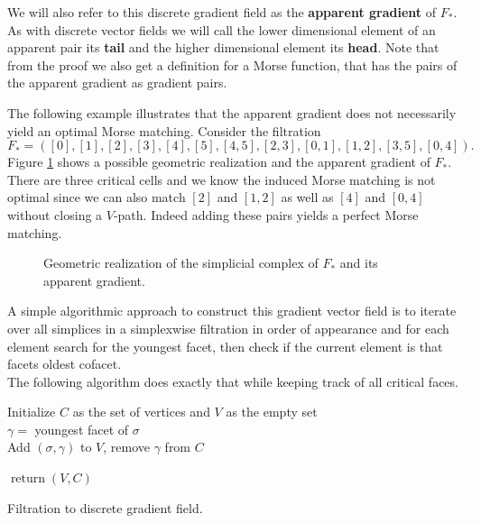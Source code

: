 We will also refer to this discrete gradient field as the \textbf{apparent gradient} of $F_*$. As with discrete vector fields we will call the lower dimensional element of an apparent pair its \textbf{tail} and the higher dimensional element its \textbf{head}. Note that from the proof we also get a definition for a Morse function, that has the pairs of the apparent gradient as gradient pairs.

The following example illustrates that the apparent gradient does not necessarily yield an optimal Morse matching. Consider the filtration \[
F_* = ([0],[1],[2],[3],[4],[5],[4,5],[2,3],[0,1],[1,2],[3,5],[0,4]).
\]
Figure \ref{fig:not_opt_example} shows a possible geometric realization and the apparent gradient of $F_*$. There are three critical cells and we know the induced Morse matching is not optimal since we can also match $[2]$ and $[1,2]$ as well as $[4]$ and $[0,4]$ without closing a $V$-path. Indeed adding these pairs yields a perfect Morse matching.


\begin{figure}[H]
\noindent%
\centering%

\caption{Geometric realization of the simplicial complex of $F_*$ and its apparent gradient.}
\label{fig:not_opt_example}

\end{figure}


A simple algorithmic approach to construct this gradient vector field is to iterate over all simplices in a simplexwise filtration in order of appearance and for each element search for the youngest facet, then check if the current element is that facets oldest cofacet.\\ The following algorithm does exactly that while keeping track of all critical faces.

\begin{algorithm}[H]

Initialize $C$ as the set of vertices and $V$ as the empty set\\
{
    $\gamma = $ youngest facet of $\sigma$\\
    {Add $(\sigma,\gamma)$ to $V$, remove $\gamma$ from $C$}
}

$\operatorname{return}(V,C)$
\caption{Filtration to discrete gradient field.}

\label{algo:filtration_to_dmf}
\end{algorithm} 
\vspace{0.5cm}

